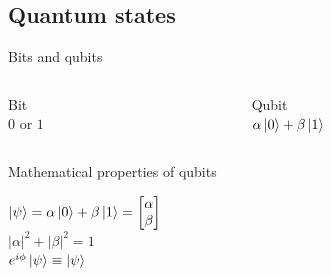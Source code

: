 \subsection{Quantum states}
\begin{frame}{Bits and qubits}
    \begin{columns}
        \begin{column}[t]{0.5\textwidth}
            \begin{center}
                \huge
                Bit\\
                $0$ or $1$
            \end{center}
        \end{column}
        \begin{column}[t]{0.5\textwidth}
            \begin{center}
                \huge
                Qubit\\
                $\alpha\ket{0}+\beta\ket{1}$
            \end{center}
        \end{column}
    \end{columns}
\end{frame}
\begin{frame}{Mathematical properties of qubits}
    \begin{center}
        \Large
        $\ket{\psi} = \alpha\ket{0}+\beta\ket{1} =
        \begin{bmatrix}
            \alpha \\
            \beta
        \end{bmatrix}$\\[1cm]
        $|\alpha|^2 + |\beta|^2=1$\\[1cm]
        $e^{i\phi}\ket{\psi}\equiv \ket{\psi}$
        \\[1cm]
    \end{center}
\end{frame}
